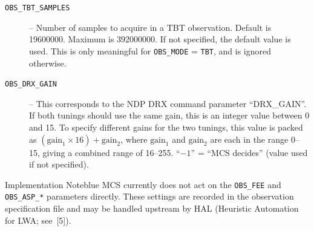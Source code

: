 \begin{description}
\item[\texttt{OBS\_TBT\_SAMPLES}] -- Number of samples to acquire in a TBT observation.  Default is 19600000.  Maximum is 392000000.  If not specified, the default value is used.  This is only meaningful for \texttt{OBS\_MODE} = \texttt{TBT}, and is ignored otherwise.

\item[\texttt{OBS\_DRX\_GAIN}] -- This corresponds to the NDP DRX command parameter ``DRX\_GAIN''.  If both tunings should use the same gain, this is an integer value between 0 and 15.  To specify different gains for the two tunings, this value is packed as $(\text{gain}_1 \times 16) + \text{gain}_2$, where $\text{gain}_1$ and $\text{gain}_2$ are each in the range 0--15, giving a combined range of 16--255.  ``$-1$'' = ``MCS decides'' (value used if not specified).
\end{description}

\begin{calloutBox}{Implementation Note}{blue}
MCS currently does not act on the \texttt{OBS\_FEE} and \texttt{OBS\_ASP\_*} parameters directly.  These settings are recorded in the observation specification file and may be handled upstream by HAL (Heuristic Automation for LWA; see~[5]).
\end{calloutBox}
